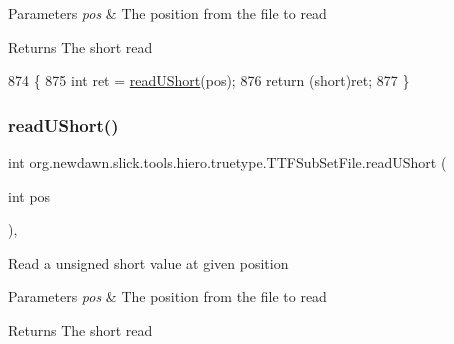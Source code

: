 \begin{DoxyParams}{Parameters}
{\em pos} & The position from the file to read \\
\hline
\end{DoxyParams}
\begin{DoxyReturn}{Returns}
The short read 
\end{DoxyReturn}

\begin{DoxyCode}
874                                      \{
875         \textcolor{keywordtype}{int} ret = \mbox{\hyperlink{classorg_1_1newdawn_1_1slick_1_1tools_1_1hiero_1_1truetype_1_1_t_t_f_sub_set_file_a285a94a3f338e2126273b089bd1d2f24}{readUShort}}(pos);
876         \textcolor{keywordflow}{return} (\textcolor{keywordtype}{short})ret;
877     \}
\end{DoxyCode}
\mbox{\label{classorg_1_1newdawn_1_1slick_1_1tools_1_1hiero_1_1truetype_1_1_t_t_f_sub_set_file_a285a94a3f338e2126273b089bd1d2f24}} 
\subsubsection{\texorpdfstring{read\+U\+Short()}{readUShort()}}
{\footnotesize\ttfamily int org.\+newdawn.\+slick.\+tools.\+hiero.\+truetype.\+T\+T\+F\+Sub\+Set\+File.\+read\+U\+Short (\begin{DoxyParamCaption}\item[{int}]{pos }\end{DoxyParamCaption})\hspace{0.3cm}{\ttfamily [inline]}, {\ttfamily [private]}}

Read a unsigned short value at given position


\begin{DoxyParams}{Parameters}
{\em pos} & The position from the file to read \\
\hline
\end{DoxyParams}
\begin{DoxyReturn}{Returns}
The short read 
\end{DoxyReturn}

